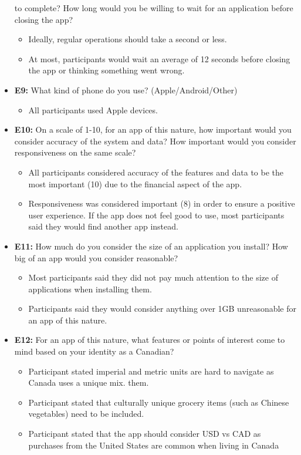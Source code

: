 \documentclass[12pt]{article}
\begin{document}
\begin{itemize}
  to complete? How long would you be willing to wait for an application before closing the app?
    \begin{itemize}
      \item Ideally, regular operations should take a second or less.
      \item At most, participants would wait an average of 12 seconds before closing the app or
      thinking something went wrong.
    \end{itemize}
  \item \textbf{E9:} What kind of phone do you use? (Apple/Android/Other)
    \begin{itemize}
      \item All participants used Apple devices.
    \end{itemize}
  \item \textbf{E10:} On a scale of 1-10, for an app of this nature, how important would you consider accuracy
  of the system and data? How important would you consider responsiveness on the same scale?
    \begin{itemize}
      \item All participants considered accuracy of the features and data to be the most important (10) due
      to the financial aspect of the app.
      \item Responsiveness was considered important (8) in order to ensure a positive user experience. If the
      app does not feel good to use, most participants said they would find another app instead.
    \end{itemize}
  \item \textbf{E11:} How much do you consider the size of an application you install? How big of an app would you
  consider reasonable?
    \begin{itemize}
      \item Most participants said they did not pay much attention to the size of applications when installing
      them.
      \item Participants said they would consider anything over 1GB unreasonable for an app of this nature.
    \end{itemize}
  \item \textbf{E12:} For an app of this nature, what features or points of interest come to mind based on your identity as a Canadian?
    \begin{itemize}
      \item Participant stated imperial and metric units are hard to navigate as Canada uses a unique mix. 
      them.
      \item Participant stated that culturally unique grocery items (such as Chinese vegetables) need to be included.
      \item Participant stated that the app should consider USD vs CAD as purchases from the United States are common when living in Canada
    \end{itemize}
\end{itemize}
\end{document}
